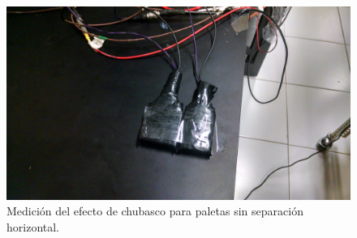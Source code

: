\documentclass[a4paper,10pt]{article}
\numberwithin{equation}{section}
\begin{document}
\begin{figure}[H]
 \center 
 \includegraphics[scale=0.08]{Imagenes/chubasco1}
 \caption{Medición del efecto de chubasco para paletas sin separación horizontal.}
\end{figure}
\end{document}
